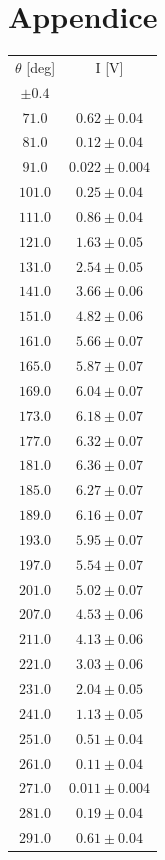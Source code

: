 \documentclass[10pt,oneside,a4paper]{article}
\begin{document}
\section{Appendice}

\begin{table}[H]
\centering
{}
\label{tab:malus1}
\begin{tabular}{cc}
\hline
 $\theta$ [deg]& I [V]\\
 $\pm 0.4$ & \\
\hline
 $ 71.0 $& $  0.62  \pm  0.04 $\\
 $  81.0$  &$ 0.12\pm    0.04  $\\
 $ 91.0 $& $ 0.022 \pm  0.004$\\
 $101.0$ &$  0.25 \pm  0.04 $\\
  $111.0 $ & $ 0.86 \pm 0.04 $\\
 $121.0$ &$  1.63 \pm  0.05 $\\
 $131.0$ &$  2.54 \pm  0.05 $ \\
 $141.0$ &$  3.66 \pm  0.06 $\\
 $151.0$ &$  4.82 \pm  0.06 $\\
 $161.0$ &$  5.66 \pm  0.07  $\\
 $165.0$ &$  5.87 \pm  0.07 $\\
 $169.0$ &$  6.04 \pm  0.07 $\\
 $173.0$ &$  6.18 \pm  0.07 $\\
 $177.0$ &$  6.32 \pm  0.07 $\\
 $181.0$ &$  6.36 \pm  0.07 $\\
 $185.0$ &$  6.27 \pm  0.07 $\\
 $189.0$ &$  6.16 \pm  0.07 $\\
 $193.0$ &$  5.95 \pm  0.07 $\\
 $197.0$ &$  5.54 \pm  0.07 $\\
 $201.0$ &$  5.02 \pm  0.07 $\\
 $207.0$ &$  4.53 \pm  0.06 $\\
 $ 211.0$ &$ 4.13 \pm  0.06 $ \\
 $221.0$ &$  3.03 \pm  0.06 $\\
 $231.0$ &$  2.04 \pm  0.05 $\\
 $241.0$ &$  1.13 \pm  0.05 $\\
 $251.0$ &$  0.51 \pm  0.04 $\\
 $261.0$ &$  0.11 \pm  0.04$ \\
 $271.0$ &$  0.011 \pm 0.004 $\\
 $281.0$ &$  0.19 \pm  0.04 $\\
 $291.0$ &$  0.61 \pm  0.04 $\\
\hline
\end{tabular}
\end{table}
\end{document}
